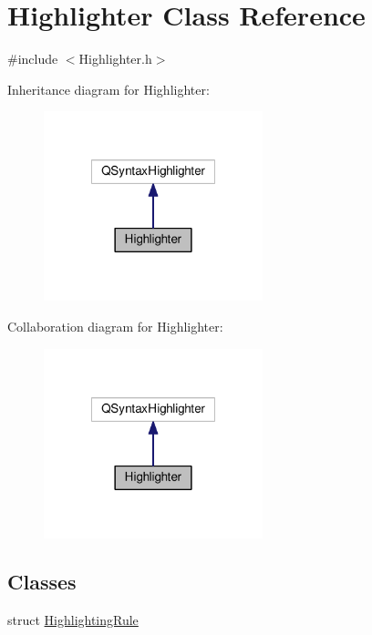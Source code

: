 \hypertarget{class_highlighter}{\section{Highlighter Class Reference}
\label{class_highlighter}
}


{\ttfamily \#include $<$Highlighter.\-h$>$}



Inheritance diagram for Highlighter\-:\nopagebreak
\begin{figure}[H]
\begin{center}
\leavevmode
\includegraphics[width=180pt]{class_highlighter__inherit__graph}
\end{center}
\end{figure}


Collaboration diagram for Highlighter\-:\nopagebreak
\begin{figure}[H]
\begin{center}
\leavevmode
\includegraphics[width=180pt]{class_highlighter__coll__graph}
\end{center}
\end{figure}
\subsection*{Classes}
\begin{DoxyCompactItemize}
\item 
struct \hyperlink{struct_highlighter_1_1_highlighting_rule}{Highlighting\-Rule}
\end{DoxyCompactItemize}
